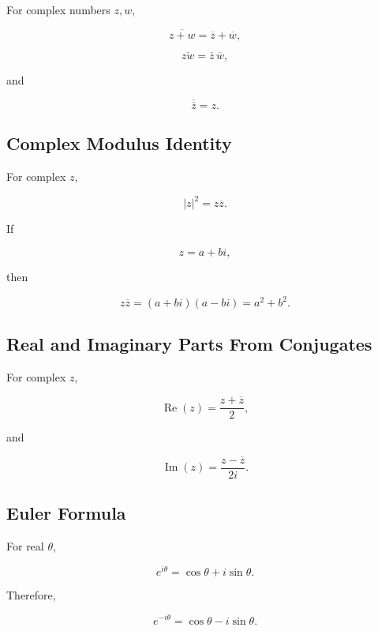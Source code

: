 For complex numbers \(z,w\),

\[
\boxed{
\overline{z+w}
=
\overline z+\overline w,
}
\]

\[
\boxed{
\overline{zw}
=
\overline z\,\overline w,
}
\]

and

\[
\boxed{
\overline{\overline z}
=
z.
}
\]

\subsection{Complex Modulus Identity}
\label{subsec:complex-modulus-identity}

For complex \(z\),

\[
\boxed{
|z|^2
=
z\overline z.
}
\]

If

\[
z=a+bi,
\]

then

\[
z\overline z
=
(a+bi)(a-bi)
=
a^2+b^2.
\]

\subsection{Real and Imaginary Parts From Conjugates}
\label{subsec:real-imag-conjugate-identities}

For complex \(z\),

\[
\boxed{
\operatorname{Re}(z)
=
\frac{
z+\overline z
}{2},
}
\]

and

\[
\boxed{
\operatorname{Im}(z)
=
\frac{
z-\overline z
}{
2i
}.
}
\]

\subsection{Euler Formula}
\label{subsec:euler-formula-algebraic-identities}

For real \(\theta\),

\[
\boxed{
e^{i\theta}
=
\cos\theta+i\sin\theta.
}
\]

Therefore,

\[
\boxed{
e^{-i\theta}
=
\cos\theta-i\sin\theta.
}
\]


